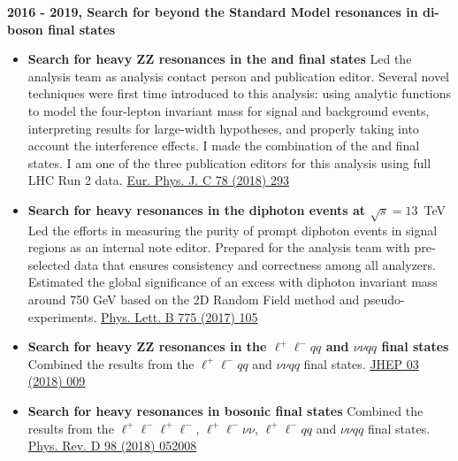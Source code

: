 \noindent\textbf{2016 - 2019, Search for beyond the Standard Model resonances in di-boson final states}
\begin{itemize}
    \item  \textbf{Search for heavy ZZ resonances in the \llll and \llvv final states} \newline
        Led the analysis team as analysis contact person and publication editor.
        Several novel techniques were first time introduced to this analysis: using analytic
        functions to model the four-lepton invariant mass for signal and background events, 
        interpreting results for large-width hypotheses, and properly taking into
        account the interference effects. I made the combination of the \llll and \llvv final states.
        I am one of the three publication editors for this analysis using  full LHC Run 2 data.
        \href{https://atlas.web.cern.ch/Atlas/GROUPS/PHYSICS/PAPERS/HIGG-2016-19/}{Eur. Phys. J. C 78 (2018) 293}
    \item \textbf{Search for heavy resonances in the diphoton events at $\sqrt{s} = 13$}~TeV \newline
        Led the efforts in measuring the purity of prompt diphoton events in signal regions as an internal
        note editor. Prepared for the analysis team with pre-selected data that ensures consistency and correctness among all analyzers. Estimated the global significance of an excess with diphoton invariant mass around 750 GeV 
        based on the 2D Random Field method
        and pseudo-experiments.
        \href{http://atlas.web.cern.ch/Atlas/GROUPS/PHYSICS/PAPERS/HIGG-2016-17/}{Phys. Lett. B 775 (2017) 105}
    \item \textbf{Search for heavy ZZ resonances in the $\ell^+\ell^- qq$ and $\nu\nu qq$ final states} \newline
        Combined the results from the $\ell^+\ell^- qq$ and $\nu\nu qq$ final states.
        \href{https://link.springer.com/article/10.1007/JHEP03(2018)009}{JHEP 03 (2018) 009}
    \item \textbf{Search for heavy resonances in bosonic final states} \newline
        Combined the results from the $\ell^+\ell^-\ell^+\ell^-$, $\ell^+\ell^-\nu\nu$, $\ell^+\ell^- qq$ and $\nu\nu qq$ final states.
        \href{https://journals.aps.org/prd/abstract/10.1103/PhysRevD.98.052008}{Phys. Rev. D 98 (2018) 052008}
\end{itemize}

